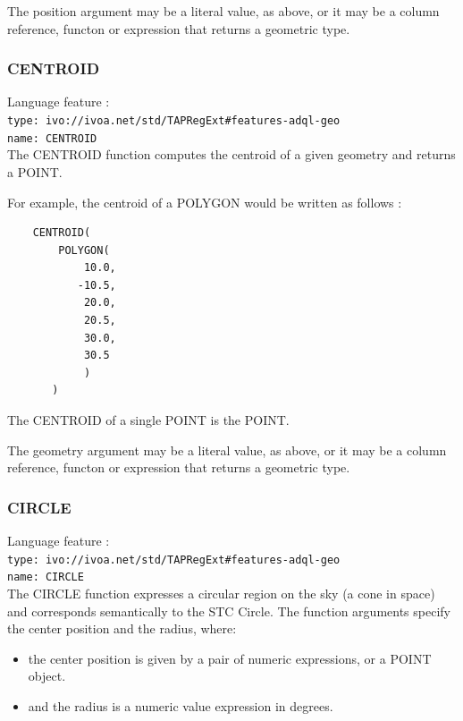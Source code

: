 \documentclass[11pt,a4paper]{ivoa}
\begin{document}
The position argument may be a literal value, as above, or it may be a
column reference, functon or expression that returns a geometric type.

\subsubsection{CENTROID}
\label{sec:functions.geom.centroid}
{\footnotesize Language feature :}\\
{\footnotesize \verb|type: ivo://ivoa.net/std/TAPRegExt#features-adql-geo|}\\
{\footnotesize \verb|name: CENTROID|}\\

The CENTROID function computes the centroid of a given geometry and returns a POINT.

For example, the centroid of a POLYGON would be written as follows :

\begin{verbatim}
    CENTROID(
        POLYGON(
            10.0,
           -10.5,
            20.0,
            20.5,
            30.0,
            30.5
            )
       )
\end{verbatim}

The CENTROID of a single POINT is the POINT.

The geometry argument may be a literal value, as above, or it may be a
column reference, functon or expression that returns a geometric type.

\subsubsection{CIRCLE}
\label{sec:functions.geom.circle}
{\footnotesize Language feature :}\\
{\footnotesize \verb|type: ivo://ivoa.net/std/TAPRegExt#features-adql-geo|}\\
{\footnotesize \verb|name: CIRCLE|}\\

The CIRCLE function expresses a circular region on the sky (a cone in space) and
corresponds semantically to the STC Circle.
The function arguments specify the center position and the radius, where:

\begin{itemize}
    \item the center position is given by a pair of numeric expressions, or a POINT object.
    \item and the radius is a numeric value expression in degrees.
\end{itemize}
\end{document}
